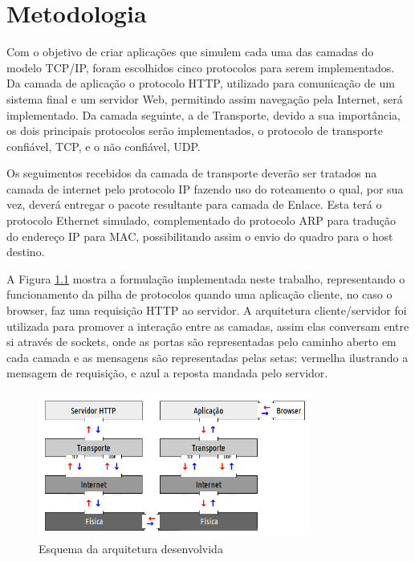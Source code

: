 
\chapter{Metodologia}
\label{chap:metodologia}
Com o objetivo de criar aplicações que simulem cada uma das camadas do modelo TCP/IP, foram escolhidos cinco protocolos para serem implementados. Da camada de aplicação o protocolo HTTP, utilizado para comunicação de um sistema final e um servidor Web, permitindo assim navegação pela Internet, será implementado. Da camada seguinte, a de Transporte, devido a sua importância, os dois principais protocolos serão implementados, o protocolo de transporte confiável, TCP, e o não confiável, UDP.
 
Os seguimentos recebidos da camada de transporte deverão ser tratados na camada de internet pelo protocolo IP fazendo uso do roteamento o qual, por sua vez, deverá entregar o pacote resultante para camada de Enlace. Esta terá o protocolo Ethernet simulado, complementado do protocolo ARP para tradução do endereço IP para MAC, possibilitando assim o envio do quadro para o host destino.

A Figura \ref{fig:objetivo} mostra a formulação implementada neste trabalho, representando o funcionamento da pilha de protocolos quando uma aplicação cliente, no caso o browser, faz uma requisição HTTP ao servidor. A arquitetura cliente/servidor foi utilizada para promover a interação entre as camadas, assim elas conversam entre si através de sockets, onde as portas são representadas pelo caminho aberto em cada camada e as mensagens são representadas pelas setas: vermelha ilustrando a mensagem de requisição, e azul a reposta mandada pelo servidor.


\begin{figure}[H]
	\centering
    \includegraphics[width=0.80\textwidth]{04-figuras/Esquema.png}
    \caption{Esquema da arquitetura desenvolvida}
    \label{fig:objetivo}
\end{figure}

